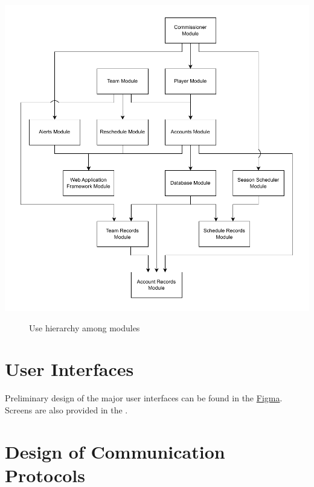 \documentclass[12pt, titlepage]{article}
\begin{document}
\includegraphics[scale=1]{9_use_hierarchy_diagram.pdf}

\begin{figure}[H]
\centering
\caption{Use hierarchy among modules}
\label{FigUH}
\end{figure}


\section{User Interfaces}

Preliminary design of the major user interfaces can be found in the \href{https://www.figma.com/proto/5YNR4bBk1vqGhvvdioqJnI/Capstone-MG-Sketches?node-id=4-2&p=f&t=sLgjpB9bWIdGXPd8-1&scaling=scale-down&content-scaling=fixed&page-id=0%3A1}{Figma}.
Screens are also provided in the .

\section{Design of Communication Protocols}
\end{document}
